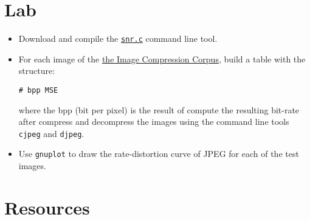 \section{Lab}
\begin{itemize}
\item Download and compile the
  \href{http://www.ace.ual.es/~vruiz/docencia/doctorado/snr.c}{\texttt{snr.c}}
  command line tool.
\item For each image of the
  \href{http://www.ace.ual.es/~vruiz/images/}{the Image Compression
    Corpus}, build a table with the structure:
\begin{verbatim}
# bpp MSE
\end{verbatim}
where the bpp (bit per pixel) is the result of compute the resulting
bit-rate after compress and decompress the images using the command
line tools \texttt{cjpeg} and \texttt{djpeg}.
\item Use \texttt{gnuplot} to draw the rate-distortion curve of JPEG
  for each of the test images.
\end{itemize}


\begin{comment}
\item En el Apéndice \ref{ape:vids_make} se presenta un fichero
  \texttt{Makefile} que muestra cómo invocar al programa
  \textit{FFMPEG} (\texttt{ffmpeg.mplayerhq.hu}) para generar una
  secuencia de vídeo en formato M-JPEG.
\item Acceda al directorio \texttt{vids} que encontrará a la misma
  altura que este documento en el sistema de ficheros y visualice los
  vídeos \texttt{*MJPEG*}.
\item En Linux se recomienda usar el programa \textit{MPlayer}
  (\texttt{www.mplayerhq.hu}). Para lanzarlo ejecutar, por ejemplo:
\begin{verbatim}
mplayer -loop 0 -fs archivo_video
\end{verbatim}
\item  Bajo Windows se recomienda usar el programa \textit{VLC media
    player} (\texttt{www.videolan.org}).
\end{comment}

\section{Resources}
\renewcommand{\addcontentsline}[3]{}%
%

